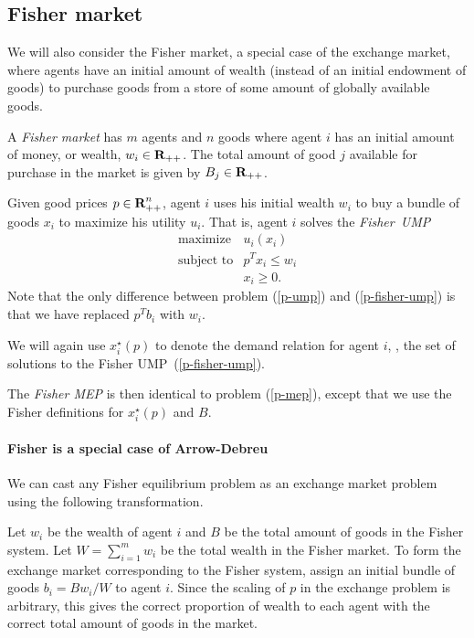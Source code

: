\documentclass[12pt]{article}
\begin{document}
\subsection{Fisher market}

We will also consider the Fisher market, a special case of the exchange market,
where agents have an initial amount of wealth (instead of an initial endowment
of goods) to purchase goods from a store of some amount of globally available
goods.

A \emph{Fisher market} has $m$ agents and $n$ goods where agent $i$ has an
initial amount of money, or wealth, $w_i \in {\mbox{\bf R}}_{++}$. The total amount of
good $j$ available for purchase in the market is given by $B_j \in
{\mbox{\bf R}}_{++}$.

Given good prices $p \in {\mbox{\bf R}}^n_{++}$, agent $i$ uses his initial wealth
$w_i$ to buy a bundle of goods $x_i$ to maximize his utility $u_i$. That is,
agent $i$ solves the \emph{Fisher~UMP}
\begin{equation}
\label{p-fisher-ump}
\begin{array}{ll}
\mbox{maximize} & u_i(x_i) \\
\mbox{subject to} & p^T x_i \leq w_i \\
& x_i \geq 0.
\end{array}
\end{equation}
Note that the only difference between problem (\ref{p-ump}) and
(\ref{p-fisher-ump}) is that we have replaced $p^T b_i$ with $w_i$.

We will again use $x^\star_i(p)$ to denote the demand relation for agent $i$,
\ie, the set of solutions to the Fisher UMP~(\ref{p-fisher-ump}).

The \emph{Fisher MEP} is then identical to problem (\ref{p-mep}), except that
we use  the Fisher definitions for $x^\star_i(p)$ and $B$.


\paragraph{Fisher is a special case of Arrow-Debreu}

We can cast any Fisher equilibrium problem as an exchange market problem using
the following transformation.

Let $w_i$ be the wealth of agent $i$ and $B$ be the total amount of goods in
the Fisher system. Let $W = \sum_{i=1}^m w_i$ be the total wealth in the Fisher
market. To form the exchange market corresponding to the Fisher system, assign
an initial bundle of goods $b_i = B w_i/W$ to agent $i$. Since the scaling of
$p$ in the exchange problem is arbitrary, this gives the correct proportion of
wealth to each agent with the correct total amount of goods in the market.
\end{document}
